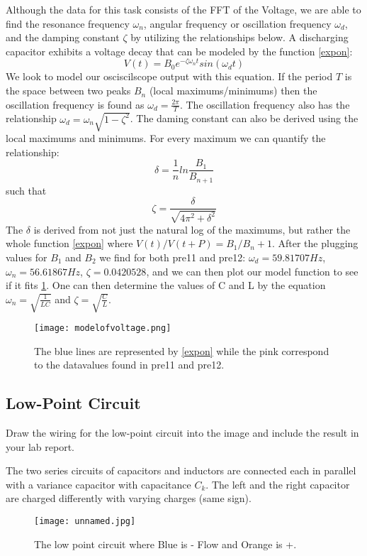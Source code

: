 \documentclass{article}
\begin{document}
Although the data for this task consists of the FFT of the Voltage, we are able to find the resonance frequency $\omega_n$, angular frequency or oscillation frequency $\omega_d$, and the damping constant $\zeta$ by utilizing the relationships below. A discharging capacitor exhibits a voltage decay that can be modeled by the function \ref{expon}:
\begin{equation}
V(t) = B_0e^{-\zeta \omega_n t}sin(\omega_dt)
\label{expon}
\end{equation}
We look to model our osciscilscope output with this equation. If the period $T$ is the space between two peaks $B_n$ (local maximums/minimums) then the oscillation frequency is found as $\omega_d = \frac{2\pi}{T}$. The oscillation frequency also has the relationship $\omega_d = \omega_n \sqrt{1-\zeta^2}$. The daming constant can also be derived using the local maximums and minimums. For every maximum we can quantify the relationship: $$\delta =\frac{1}{n}ln\frac{B_1}{B_{n+1}}$$ such that $$\zeta = \frac{\delta}{\sqrt{4\pi^2 + \delta^2}}$$
The $\delta$ is derived from not just the natural log of the maximums, but rather the whole function \ref{expon} where $V(t)/V(t+P) = B_1/B_n+1$. After the plugging values for $B_1$ and $B_2$ we find for both pre11 and pre12: $\omega_d = 59.81707 Hz$, $\omega_n = 56.61867 Hz$, $\zeta = 0.0420528$, and we can then plot our model function to see if it fits \ref{modelfunction}. One can then determine the values of C and L by the equation $\omega_n = \sqrt{\frac{1}{LC}}$ and $\zeta = \sqrt{\frac{C}{L}}$.

\begin{figure}[h]
  \centering
  \texttt{[image: modelofvoltage.png]}
  \caption[scale=1.5]{The blue lines are represented by \ref{expon} while the pink correspond to the datavalues found in pre11 and pre12.}
  \label{modelfunction}
\end{figure}

\subsection{Low-Point Circuit}
Draw the wiring for the low-point circuit into the image and include the result in your lab report.

The two series circuits of capacitors and inductors are connected each in parallel with a variance capacitor with capacitance $C_k$. The left and the right capacitor are charged differently with varying charges (same sign).
\begin{figure}[h]
  \centering
  \texttt{[image: unnamed.jpg]}
  \caption{The low point circuit where Blue is - Flow and Orange is +.}
  \label{lowpoint}
\end{figure}
\end{document}
